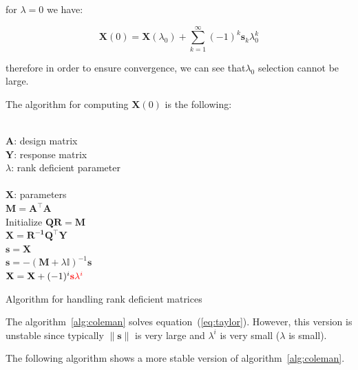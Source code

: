 \noindent for $\lambda=0$ we have:

\begin{equation}
\label{eq:taylor}
    \mathbf{X}(0)=\mathbf{X}(\lambda_0) + \sum_{k=1}^\infty
     (-1)^k \mathbf{s}_k \lambda_0^k
\end{equation}


\noindent therefore in order to ensure convergence, we can see that$\lambda_0$
selection cannot be large. 

The algorithm for computing $\mathbf{X}(0)$ is the following:

\begin{algorithm}[H]
\begin{algorithmic}[1]
\REQUIRE $\,$ \\
$\mathbf{A}$: design matrix \\
$\mathbf{Y}$: response matrix \\
$\lambda$: rank deficient parameter \\
\ENSURE  $\,$ \\
$\mathbf{X}$: parameters \\
\STATE $\mathbf{M}=\mathbf{A^\top A}$ \\
\STATE Initialize $\mathbf{Q R}=\mathbf{M}$ \\
\STATE $\mathbf{X} = \mathbf{R^{-1}Q^\top Y}$ \\
\STATE $\mathbf{s} = \mathbf{X}$ \\
	\STATE $\mathbf{s} =
        -(\mathbf{M}+\lambda\mathbb{I})^{-1}\mathbf{s}$\\
	\STATE $\mathbf{X}=\mathbf{X} + (-1)^i {\color{red}\mathbf{s}
        \lambda^i}$
\ENDFOR
\end{algorithmic}
\caption{Algorithm for handling rank deficient matrices}
\label{alg:coleman}
\end{algorithm}

The algorithm~\ref{alg:coleman} solves equation~(\ref{eq:taylor}). However, this
version is unstable since typically $\|\mathbf{s}\|$ is very large and
$\lambda^i$ is very small ($\lambda$ is small).

The following algorithm shows a more stable version of
algorithm~\ref{alg:coleman}.


